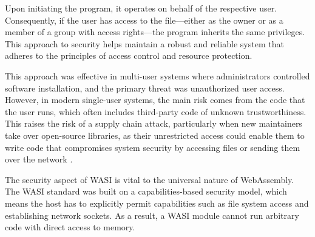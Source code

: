 Upon initiating the program, it operates on behalf of the respective user. Consequently, if the user has access to the file—either as the owner or as a member of a group with access rights—the program inherits the same privileges. This approach to security helps maintain a robust and reliable system that adheres to the principles of access control and resource protection.

This approach was effective in multi-user systems where administrators controlled software installation, and the primary threat was unauthorized user access. However, in modern single-user systems, the main risk comes from the code that the user runs, which often includes third-party code of unknown trustworthiness. This raises the risk of a supply chain attack, particularly when new maintainers take over open-source libraries, as their unrestricted access could enable them to write code that compromises system security by accessing files or sending them over the network \cite{clark_2019_standardising}.


The security aspect of WASI is vital to the universal nature of WebAssembly. The WASI standard was built on a capabilities-based security model, which means the host has to explicitly permit capabilities such as file system access and establishing network sockets. As a result, a WASI module cannot run arbitrary code with direct access to memory.


